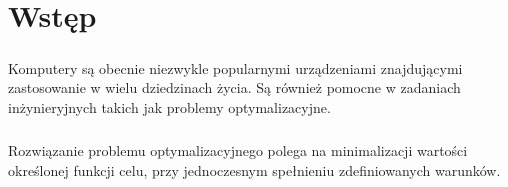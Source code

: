 \chapter*{Wstęp}
\paragraph{}Komputery są obecnie niezwykle popularnymi urządzeniami znajdującymi zastosowanie w wielu dziedzinach życia. Są również pomocne w zadaniach inżynieryjnych takich jak problemy optymalizacyjne.
\paragraph{} Rozwiązanie problemu optymalizacyjnego polega na minimalizacji wartości określonej funkcji celu, przy jednoczesnym spełnieniu zdefiniowanych warunków.~\cite{Boyd2004}
